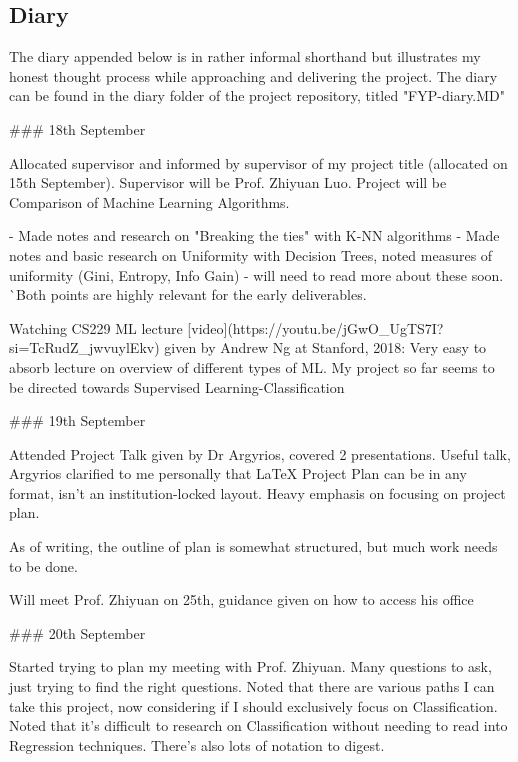\documentclass[letterpaper,10pt]{article}
\begin{document}
\subsection{Diary}
The diary appended below is in rather informal shorthand but illustrates my honest thought process while approaching and delivering the project. The diary can be found in the diary folder of the project repository, titled "FYP-diary.MD"
\begin{markdown}

### 18th September 

Allocated supervisor and informed by supervisor of my project title (allocated on 15th September). Supervisor will be Prof. Zhiyuan Luo.
Project will be Comparison of Machine Learning Algorithms.

- Made notes and research on "Breaking the ties" with K-NN algorithms
- Made notes and basic research on Uniformity with Decision Trees, noted measures of uniformity (Gini, Entropy, Info Gain) - will need to read more about these soon.
^^ Both points are highly relevant for the early deliverables.

Watching CS229 ML lecture [video](https://youtu.be/jGwO_UgTS7I?si=TcRudZ_jwvuylEkv) given by Andrew Ng at Stanford, 2018: 
Very easy to absorb lecture on overview of different types of ML. My project so far seems to be directed towards Supervised Learning-Classification



### 19th September

Attended Project Talk given by Dr Argyrios, covered 2 presentations. Useful talk, Argyrios clarified to me personally that LaTeX Project Plan can be in any format, isn't an institution-locked layout.
Heavy emphasis on focusing on project plan.

As of writing, the outline of plan is somewhat structured, but much work needs to be done.

Will meet Prof. Zhiyuan on 25th, guidance given on how to access his office

### 20th September

Started trying to plan my meeting with Prof. Zhiyuan. Many questions to ask, just trying to find the right questions. Noted that there are various paths I can take this project, now considering if I should exclusively focus on Classification.
Noted that it's difficult to research on Classification without needing to read into Regression techniques. There's also lots of notation to digest.


\end{markdown}
\end{document}
